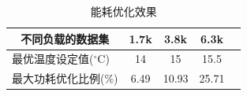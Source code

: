 
\begin{table}[]
\centering
\caption{能耗优化效果}
\label{tab:power_save_percent}
\begin{tabular}{lcccc}
\hline
\multicolumn{1}{c}{\textbf{不同负载的数据集}} & 1.7k  & 3.8k    & 6.3k  \\ \hline
最优温度设定值(${ }^{\circ} \mathrm{C}$)               & 14   & 15     & 15.5    \\
最大功耗优化比例(\%)              & 6.49 & 10.93  & 25.71\\ \hline
\end{tabular}
\end{table}









